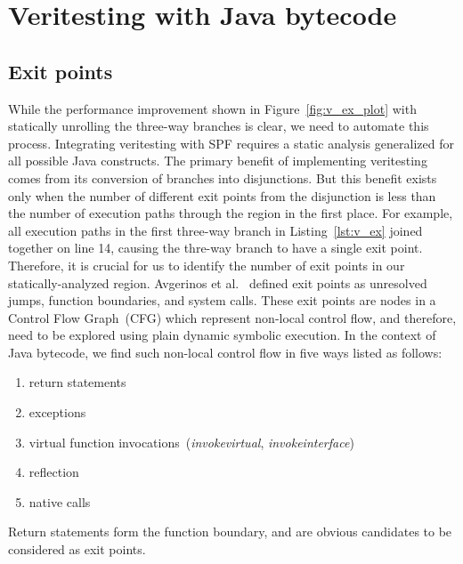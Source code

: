 \section{Veritesting with Java bytecode}
%
%
%
\subsection{Exit points}
While the performance improvement shown in Figure~\ref{fig:v_ex_plot} with statically unrolling the three-way branches is clear, we need to automate this process.
%
Integrating veritesting with SPF requires a static analysis generalized for all possible Java constructs.
%
The primary benefit of implementing veritesting comes from its conversion of branches into disjunctions.
%
But this benefit exists only when the number of different exit points from the disjunction is less than the number of execution paths through the region in the first place.
%
For example, all execution paths in the first three-way branch in Listing~\ref{lst:v_ex} joined together on line 14, causing the thre-way branch to have a single exit point.
%
Therefore, it is crucial for us to identify the number of exit points in our statically-analyzed region.
%
Avgerinos et al.~\cite{veritesting} defined exit points as unresolved jumps, function boundaries, and system calls.
%
These exit points are nodes in a Control Flow Graph~(CFG) which represent non-local control flow, and therefore, need to be explored using plain dynamic symbolic execution.
%
In the context of Java bytecode, we find such non-local control flow in five ways listed as follows:
%
\begin{enumerate}
\item return statements
\item exceptions
\item virtual function invocations~(\textit{invokevirtual}, \textit{invokeinterface})
\item reflection 
\item native calls
\end{enumerate}
%
Return statements form the function boundary, and are obvious candidates to be considered as exit points.
